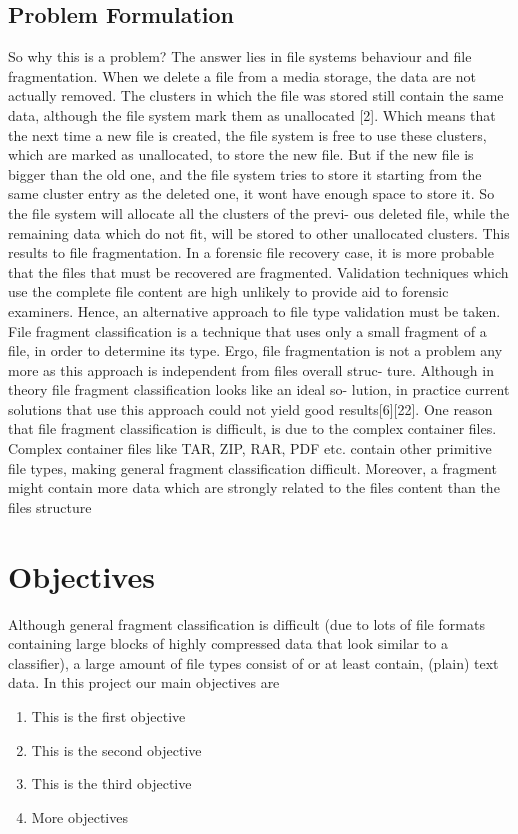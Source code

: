 \subsection*{Problem Formulation}
So why this is a problem? The answer lies in file systems behaviour and
file fragmentation. When we delete a file from a media storage, the data are
not actually removed. The clusters in which the file was stored still contain
the same data, although the file system mark them as unallocated [2]. Which
means that the next time a new file is created, the file system is free to use
these clusters, which are marked as unallocated, to store the new file. But
if the new file is bigger than the old one, and the file system tries to store it
starting from the same cluster entry as the deleted one, it wont have enough
space to store it. So the file system will allocate all the clusters of the previ-
ous deleted file, while the remaining data which do not fit, will be stored to
other unallocated clusters. This results to file fragmentation. In a forensic
file recovery case, it is more probable that the files that must be recovered are
fragmented. Validation techniques which use the complete file content
are high unlikely to provide aid to forensic examiners. Hence, an alternative
approach to file type validation must be taken.
File fragment classification is a technique that uses only a small fragment
of a file, in order to determine its type. Ergo, file fragmentation is not a
problem any more as this approach is independent from files overall struc-
ture. Although in theory file fragment classification looks like an ideal so-
lution, in practice current solutions that use this approach could not yield
good results[6][22]. One reason that file fragment classification is difficult, is
due to the complex container files. Complex container files like TAR, ZIP,
RAR, PDF etc. contain other primitive file types, making general fragment
classification difficult. Moreover, a fragment might contain more data which
are strongly related to the files content than the files structure

\section{Objectives}
Although general fragment classification is difficult (due to lots of file formats containing large blocks of highly compressed data that look similar to a classifier), a large amount of file types consist of or at least contain, (plain) text data. In this project our main objectives are
\begin{enumerate}
\item This is the first objective
\item This is the second objective
\item This is the third objective
\item More objectives
\end{enumerate}




